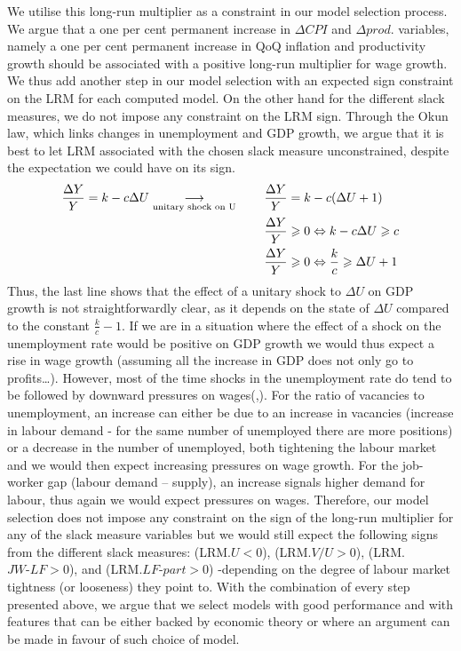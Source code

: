 We utilise this long-run multiplier as a constraint in our model selection process.
We argue that a one per cent permanent increase in $\Delta CPI$ and $\Delta prod.$ variables, namely a one per cent permanent increase in QoQ inflation and productivity growth should be associated with a positive long-run multiplier for wage growth. 
We thus add another step in our model selection with an expected sign constraint on the LRM for each computed model. 
On the other hand for the different slack measures, we do not impose any constraint on the LRM sign. 
Through the Okun law, which links changes in unemployment and GDP growth, we argue that it is best to let LRM associated with the chosen slack measure unconstrained, despite the expectation we could have on its sign.
\vspace{-0.0005cm}
\begin{align*}
    \frac{\Delta Y}{Y} = k - c\Delta U \underset{\textrm{unitary shock on U}}{\longrightarrow} \hspace*{0.7cm} \frac{\Delta Y}{Y} &= k - c(\Delta U + 1)\\
    \frac{\Delta Y}{Y} &\geqslant 0 \Leftrightarrow k - c\Delta U \geqslant c\\
    \frac{\Delta Y}{Y} &\geqslant 0 \Leftrightarrow \frac{k}{c} \geqslant \Delta U +1\\
\end{align*}
\quad Thus, the last line shows that the effect of a unitary shock to $\Delta U$ on GDP growth is not straightforwardly clear, as it depends on the state of $\Delta U$ compared to the constant $\frac{k}{c} - 1$. 
If we are in a situation where the effect of a shock on the unemployment rate would be positive on GDP growth we would thus expect a rise in wage growth (assuming all the increase in GDP does not only go to profits…). 
However, most of the time shocks in the unemployment rate do tend to be followed by downward pressures on wages(\cite{labour2},\cite{labour9}). 
For the ratio of vacancies to unemployment, an increase can either be due to an increase in vacancies (increase in labour demand - for the same number of unemployed there are more positions) or a decrease in the number of unemployed, both tightening the labour market and we would then expect increasing pressures on wage growth. 
For the job-worker gap (labour demand – supply), an increase signals higher demand for labour, thus again we would expect pressures on wages. 
Therefore, our model selection does not impose any constraint on the sign of the long-run multiplier for any of the slack measure variables but we would still expect the following signs from the different slack measures: (LRM.$U<0$), (LRM.$V/U>0$), (LRM.$JW\textrm{-}LF>0$), and (LRM.$LF\textrm{-}part>0$) -depending on the degree of labour market tightness (or looseness) they point to. 
With the combination of every step presented above, we argue that we select models with good performance and with features that can be either backed by economic theory or where an argument can be made in favour of such choice of model.

